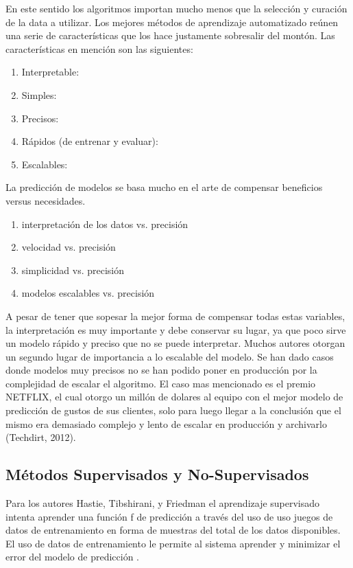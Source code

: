 \begin{spacing}{1.5}
En este sentido los algoritmos importan mucho menos que la selección y curación de la data a utilizar. Los mejores métodos de aprendizaje automatizado reúnen una serie de características que los hace justamente sobresalir del montón. Las características en mención son las siguientes:

\begin{enumerate}
	\item Interpretable: 
	\item Simples:
	\item Precisos:
	\item Rápidos (de entrenar y evaluar):
	\item Escalables: 
\end{enumerate}

La predicción de modelos se basa mucho en el arte de compensar beneficios versus necesidades.

\begin{enumerate}
	\item interpretación de los datos vs. precisión
	\item velocidad vs. precisión
	\item simplicidad vs. precisión
	\item modelos escalables vs. precisión 
\end{enumerate}

A pesar de tener que sopesar la mejor forma de compensar todas estas variables, la interpretación es muy importante y debe conservar su lugar, ya que poco sirve un modelo rápido y preciso que no se puede interpretar. Muchos autores otorgan un segundo lugar de importancia a lo escalable del modelo. Se han dado casos donde modelos muy precisos no se han podido poner en producción por la complejidad de escalar el algoritmo. El caso mas mencionado es el premio NETFLIX, el cual otorgo un millón de dolares al equipo con el mejor modelo de predicción de gustos de sus clientes, solo para luego llegar a la conclusión que el mismo era demasiado complejo y lento de escalar en producción y archivarlo (Techdirt, 2012).

\subsection{Métodos Supervisados y No-Supervisados}
Para los autores Hastie, Tibshirani, y Friedman el aprendizaje supervisado intenta aprender una función f de predicción a través del uso de uso juegos de datos de entrenamiento en forma de muestras del total de los datos disponibles. El uso de datos de entrenamiento le permite al sistema aprender y minimizar el error del modelo de predicción \cite{theElements}.  


\end{spacing}
